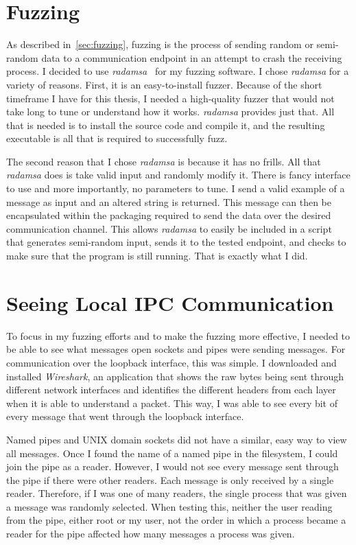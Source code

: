 \section{Fuzzing}
\label{sec:fuzzingMethods}
As described in~\ref{sec:fuzzing}, fuzzing is the process of sending random or semi-random data to a communication endpoint in an attempt to crash the receiving process.  I decided to use \textit{radamsa}~\cite{radamsa} for my fuzzing software.  I chose \textit{radamsa} for a variety of reasons.  First, it is an easy-to-install fuzzer.  Because of the short timeframe I have for this thesis, I needed a high-quality fuzzer that would not take long to tune or understand how it works.  \textit{radamsa} provides just that.  All that is needed is to install the source code and compile it, and the resulting executable is all that is required to successfully fuzz.

The second reason that I chose \textit{radamsa} is because it has no frills.  All that \textit{radamsa} does is take valid input and randomly modify it.  There is fancy interface to use and more importantly, no parameters to tune.  I send a valid example of a message as input and an altered string is returned.  This message can then be encapsulated within the packaging required to send the data over the desired communication channel.  This allows \textit{radamsa} to easily be included in a script that generates semi-random input, sends it to the tested endpoint, and checks to make sure that the program is still running.  That is exactly what I did.

\section{Seeing Local IPC Communication}
\label{sec:seeingLocalIPC}
To focus in my fuzzing efforts and to make the fuzzing more effective, I needed to be able to see what messages open sockets and pipes were sending messages.  For communication over the loopback interface, this was simple.  I downloaded and installed \textit{Wireshark}, an application that shows the raw bytes being sent through different network interfaces and identifies the different headers from each layer when it is able to understand a packet.  This way, I was able to see every bit of every message that went through the loopback interface.

Named pipes and UNIX domain sockets did not have a similar, easy way to view all messages.  Once I found the name of a named pipe in the filesystem, I could join the pipe as a reader.  However, I would not see every message sent through the pipe if there were other readers.  Each message is only received by a single reader.  Therefore, if I was one of many readers, the single process that was given a message was randomly selected.  When testing this, neither the user reading from the pipe, either root or my user, not the order in which a process became a reader for the pipe affected how many messages a process was given.

